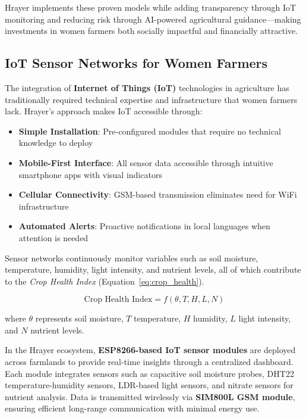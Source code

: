 \documentclass[9pt,twocolumn,twoside]{article}
\begin{document}
Hrayer implements these proven models while adding transparency through IoT monitoring and reducing risk through AI-powered agricultural guidance—making investments in women farmers both socially impactful and financially attractive.

\subsection{IoT Sensor Networks for Women Farmers}

The integration of \textbf{Internet of Things (IoT)} technologies in agriculture has traditionally required technical expertise and infrastructure that women farmers lack. Hrayer's approach makes IoT accessible through:

\begin{itemize}
\item \textbf{Simple Installation}: Pre-configured modules that require no technical knowledge to deploy
\item \textbf{Mobile-First Interface}: All sensor data accessible through intuitive smartphone apps with visual indicators
\item \textbf{Cellular Connectivity}: GSM-based transmission eliminates need for WiFi infrastructure
\item \textbf{Automated Alerts}: Proactive notifications in local languages when attention is needed
\end{itemize}

Sensor networks continuously monitor variables such as soil moisture, temperature, humidity, light intensity, and nutrient levels, all of which contribute to the \textit{Crop Health Index} (Equation~\ref{eq:crop_health}).

\begin{equation}
    \text{Crop Health Index} = f(\theta, T, H, L, N)
    \label{eq:crop_health}
\end{equation}

where $\theta$ represents soil moisture, $T$ temperature, $H$ humidity, $L$ light intensity, and $N$ nutrient levels.

In the Hrayer ecosystem, \textbf{ESP8266-based IoT sensor modules} are deployed across farmlands to provide real-time insights through a centralized dashboard. Each module integrates sensors such as capacitive soil moisture probes, DHT22 temperature-humidity sensors, LDR-based light sensors, and nitrate sensors for nutrient analysis. Data is transmitted wirelessly via \textbf{SIM800L GSM module}, ensuring efficient long-range communication with minimal energy use.
\end{document}
